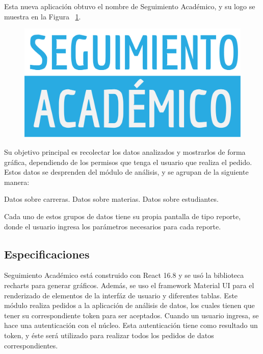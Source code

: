 Esta nueva aplicación obtuvo el nombre de Seguimiento Académico, y su logo se muestra en la Figura ~\ref{fig:seguimiento-academico-logo}.

\begin{figure}[h!]
  \centering
    \includegraphics[scale=0.5]{images/seguimiento-academico/seguimiento-academico-blanco.png}
  \label{fig:seguimiento-academico-logo}
\end{figure}

Su objetivo principal es recolectar los datos analizados y mostrarlos de forma gráfica, dependiendo de los permisos que tenga el usuario que realiza el pedido.
Estos datos se desprenden del módulo de análisis, y se agrupan de la siguiente manera:

\begin{outline}
\2 Datos sobre carreras.
\2 Datos sobre materias.
\2 Datos sobre estudiantes.
\end{outline}

Cada uno de estos grupos de datos tiene su propia pantalla de tipo reporte, donde el usuario ingresa los parámetros necesarios para cada reporte.


\subsection{Especificaciones}

Seguimiento Académico está construido con React 16.8 y se usó la biblioteca recharts para generar gráficos. Además, se uso el framework Material UI para el renderizado de elementos de la interfáz de usuario y diferentes tablas.
Este módulo realiza pedidos a la aplicación de análisis de datos, los cuales tienen que tener su correspondiente token para ser aceptados.
Cuando un usuario ingresa, se hace una autenticación con el núcleo. Esta autenticación tiene como resultado un token, y éste será utilizado para realizar todos los pedidos de datos correspondientes.


